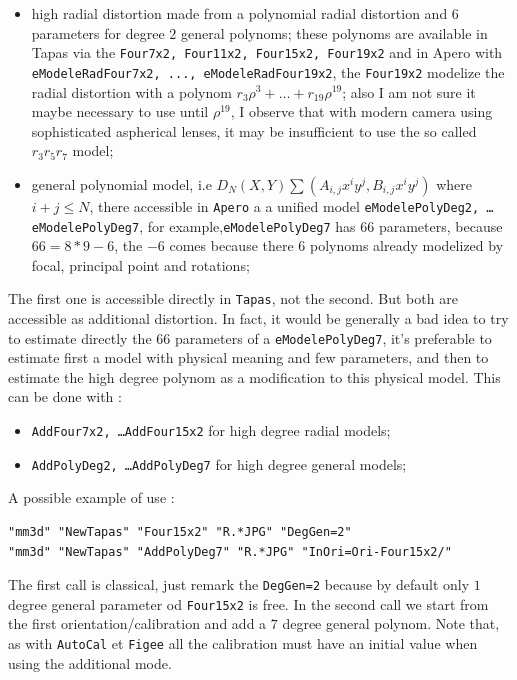 \begin{itemize}
   \item high radial distortion made from a polynomial radial distortion and $6$ parameters for degree $2$
         general polynoms; these polynoms are available in Tapas via the {\tt Four7x2, Four11x2, Four15x2, Four19x2}
         and in Apero with {\tt eModeleRadFour7x2, ..., eModeleRadFour19x2}, the {\tt Four19x2} modelize the radial
         distortion with a polynom $r_3 \rho^3 +\dots + r_{19} \rho^{19}$; also I am not sure it maybe necessary to
         use until $ \rho^{19}$, I observe that with modern camera using sophisticated aspherical lenses, it may be
         insufficient to use the so called $r_3 r_5 r_7$ model;


   \item general polynomial model, i.e $D_N(X,Y) \sum (A_{i,j} x^iy^j,B_{i,j} x^iy^j)$  where $i+j\leq N$,
         there accessible in {\tt Apero} a a unified model {\tt eModelePolyDeg2, \dots eModelePolyDeg7},
         for example,{\tt eModelePolyDeg7} has $66$ parameters, because $66=8*9-6$, the $-6$ comes because
         there $6$ polynoms already modelized by focal, principal point and rotations;
\end{itemize}

The first one is accessible directly in {\tt Tapas}, not the second. But both are accessible as additional distortion.
In fact, it would be generally a bad idea to try to estimate directly the $66$ parameters of a {\tt eModelePolyDeg7}, it's
preferable to estimate first a model with physical meaning and few parameters, and then to estimate the high degree polynom as a modification to this physical model. This can be done with :

\begin{itemize}
    \item  {\tt AddFour7x2,  \dots AddFour15x2} for high degree radial models;
    \item  {\tt AddPolyDeg2, \dots AddPolyDeg7} for high degree general models;
\end{itemize}

A possible example of use :

\begin{verbatim}
"mm3d" "NewTapas" "Four15x2" "R.*JPG" "DegGen=2"
"mm3d" "NewTapas" "AddPolyDeg7" "R.*JPG" "InOri=Ori-Four15x2/"
\end{verbatim}

The first call is classical, just remark the {\tt DegGen=2} because by default only $1$ degree
general parameter od {\tt Four15x2} is free.  In the second call we start from the first orientation/calibration
and add a $7$ degree general polynom. Note that, as with {\tt AutoCal} et {\tt Figee} all the calibration must have
an initial value when using the additional mode.

